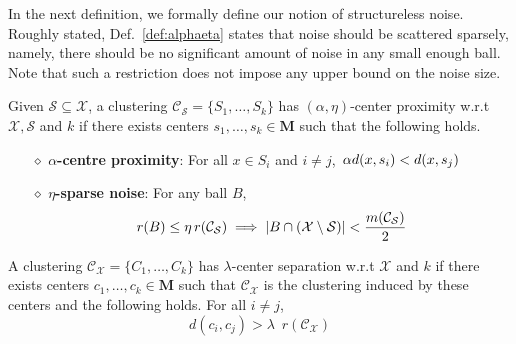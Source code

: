 \documentclass[anon,12pt]{colt2016} %
\newcommand{\mc}{\mathcal}
\newcommand{\mb}{\mathbf}
\begin{document}
In the next definition, we formally define our notion of structureless noise. Roughly stated, Def.~\ref{def:alphaeta} states that noise should be scattered sparsely, namely, there should be no significant amount of noise in any small enough ball. Note that such a restriction does not impose any upper bound on the noise size.

\begin{definition}
\label{def:alphaeta}
Given $\mc S \subseteq \mc X$, a clustering $\mc C_{\mc S} = \{S_1, \ldots, S_k\}$ has $(\alpha, \eta)$-center proximity w.r.t $\mc X, \mc S$ and $k$ if there exists centers $s_1, \ldots, s_k \in \mb M$  such that the following holds.
\begin{itemize}[nolistsep, noitemsep]
\label{defn:alphacpnoise}	

\item[$\diamond$] {\bf $\alpha$-centre proximity}: For all $x \in S_i$ and $i\neq j$, $\thinspace\alpha d(x, s_i) < d(x, s_j)$
\item[$\diamond$]{\bf $\eta$-sparse noise}: For any ball $B$, 
\vspace{-0.1in}\begin{align*}
r(B)\leq \eta \thinspace r(\mc{C}_{\mc S}) \implies |B\cap (\mc X\setminus \mc S)| < \frac{m(\mc C_{\mc S})}{2}
\end{align*}
\end{itemize}
\end{definition}

\begin{definition}
\label{defn:lambdacs}
A clustering $\mc C_{\mc X} = \{C_1, \ldots, C_k\}$ has $\lambda$-center separation w.r.t $\mc X$ and $k$ if there exists centers $c_1, \ldots, c_k \in \mb M$ such that $\mc C_{\mc X}$ is the clustering induced by these centers and the following holds. For all $i\neq j$, 
$$d(c_i, c_j) > \lambda \enspace r(\mc{C}_{\mc{X}})$$
\end{definition}
\end{document}
